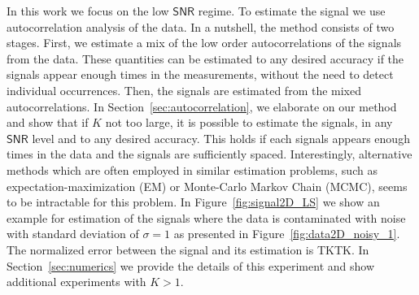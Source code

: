 \documentclass[english,11pt]{article}
\numberwithin{equation}{section}
\theoremstyle{plain}
\theoremstyle{definition}
\theoremstyle{remark}
\theoremstyle{plain}
\theoremstyle{remark}
\theoremstyle{plain}
\theoremstyle{plain}
\newcommand{\SNR}{{\textsf{SNR}}}
\begin{document}
In this work we focus on the low $\SNR$ regime. To estimate the signal we use autocorrelation analysis of the data. 
In a nutshell,
the method consists of two stages. First, we estimate a mix of the low order autocorrelations of the signals from the data. These quantities can
be estimated to any desired accuracy if the signals appear enough times in the measurements, without the need to detect individual occurrences. Then, the signals are estimated from the mixed autocorrelations.
In Section~\ref{sec:autocorrelation}, we elaborate on our method  and show that if $K$ not too large, it is possible to estimate the signals, in any $\SNR$ level and to any desired accuracy.
This holds if each signals appears enough times in the data and the signals are sufficiently spaced. 
Interestingly, alternative methods which are often employed in similar estimation problems, such as expectation-maximization (EM) or Monte-Carlo Markov Chain (MCMC), seems to be intractable for this problem. In Figure~\ref{fig:signal2D_LS} we show an example for estimation of the signals where the data is contaminated with noise with standard deviation of $\sigma=1$ as presented in Figure~\ref{fig:data2D_noisy_1}. The normalized error between the signal and its estimation is TKTK. In Section~\ref{sec:numerics} we provide the details of this experiment and show additional experiments with $K>1$. 
\end{document}
